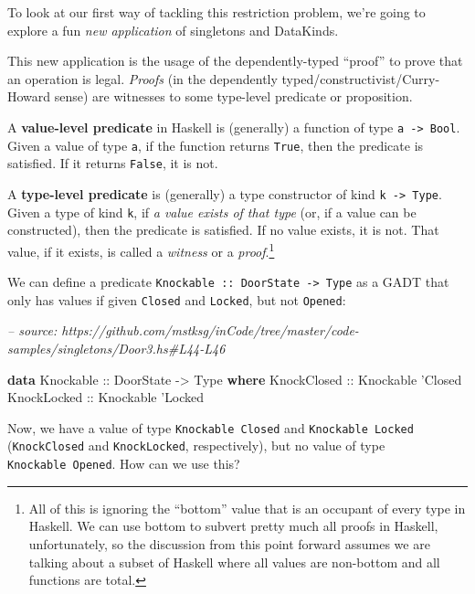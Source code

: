 \documentclass[]{article}
\newenvironment{Shaded}{}{}
\newcommand{\CommentTok}[1]{\textcolor[rgb]{0.38,0.63,0.69}{\textit{#1}}}
\newcommand{\DataTypeTok}[1]{\textcolor[rgb]{0.56,0.13,0.00}{#1}}
\newcommand{\KeywordTok}[1]{\textcolor[rgb]{0.00,0.44,0.13}{\textbf{#1}}}
\newcommand{\NormalTok}[1]{#1}
\newcommand{\OtherTok}[1]{\textcolor[rgb]{0.00,0.44,0.13}{#1}}
\begin{document}
To look at our first way of tackling this restriction problem, we're going to
explore a fun \emph{new application} of singletons and DataKinds.

This new application is the usage of the dependently-typed ``proof'' to prove
that an operation is legal. \emph{Proofs} (in the dependently
typed/constructivist/Curry-Howard sense) are witnesses to some type-level
predicate or proposition.

A \textbf{value-level predicate} in Haskell is (generally) a function of type
\texttt{a\ -\textgreater{}\ Bool}. Given a value of type \texttt{a}, if the
function returns \texttt{True}, then the predicate is satisfied. If it returns
\texttt{False}, it is not.

A \textbf{type-level predicate} is (generally) a type constructor of kind
\texttt{k\ -\textgreater{}\ Type}. Given a type of kind \texttt{k}, if \emph{a
value exists of that type} (or, if a value can be constructed), then the
predicate is satisfied. If no value exists, it is not. That value, if it exists,
is called a \emph{witness} or a \emph{proof}.\footnote{All of this is ignoring
  the ``bottom'' value that is an occupant of every type in Haskell. We can use
  bottom to subvert pretty much all proofs in Haskell, unfortunately, so the
  discussion from this point forward assumes we are talking about a subset of
  Haskell where all values are non-bottom and all functions are total.}

We can define a predicate
\texttt{Knockable\ ::\ DoorState\ -\textgreater{}\ Type} as a GADT that only has
values if given \texttt{\textquotesingle{}Closed} and
\texttt{\textquotesingle{}Locked}, but not \texttt{\textquotesingle{}Opened}:

\begin{Shaded}
\begin{Highlighting}[]
\CommentTok{-- source: https://github.com/mstksg/inCode/tree/master/code-samples/singletons/Door3.hs#L44-L46}

\KeywordTok{data} \DataTypeTok{Knockable}\OtherTok{ ::} \DataTypeTok{DoorState} \OtherTok{->} \DataTypeTok{Type} \KeywordTok{where}
    \DataTypeTok{KnockClosed}\OtherTok{ ::} \DataTypeTok{Knockable}\NormalTok{ '}\DataTypeTok{Closed}
    \DataTypeTok{KnockLocked}\OtherTok{ ::} \DataTypeTok{Knockable}\NormalTok{ '}\DataTypeTok{Locked}
\end{Highlighting}
\end{Shaded}

Now, we have a value of type \texttt{Knockable\ \textquotesingle{}Closed} and
\texttt{Knockable\ \textquotesingle{}Locked} (\texttt{KnockClosed} and
\texttt{KnockLocked}, respectively), but no value of type
\texttt{Knockable\ \textquotesingle{}Opened}. How can we use this?
\end{document}
